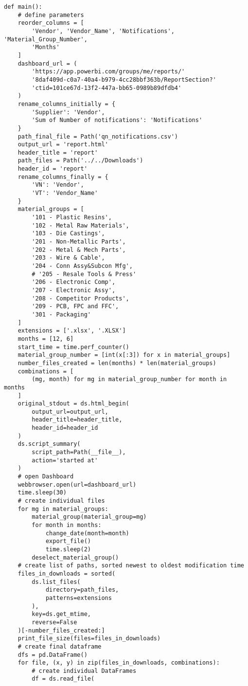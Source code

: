 \documentclass[10pt, letterpaper, twoside]{article}
\begin{document}
\begin{footnotesize}
\begin{verbatim}
def main():
    # define parameters
    reorder_columns = [
        'Vendor', 'Vendor_Name', 'Notifications', 'Material_Group_Number',
        'Months'
    ]
    dashboard_url = (
        'https://app.powerbi.com/groups/me/reports/'
        '8daf409d-c0a7-40a4-b979-4cc28bbf363b/ReportSection?'
        'ctid=101ce67d-13f2-447a-bb65-0989b89dfdb4'
    )
    rename_columns_initially = {
        'Supplier': 'Vendor',
        'Sum of Number of notifications': 'Notifications'
    }
    path_final_file = Path('qn_notifications.csv')
    output_url = 'report.html'
    header_title = 'report'
    path_files = Path('../../Downloads')
    header_id = 'report'
    rename_columns_finally = {
        'VN': 'Vendor',
        'VT': 'Vendor_Name'
    }
    material_groups = [
        '101 - Plastic Resins',
        '102 - Metal Raw Materials',
        '103 - Die Castings',
        '201 - Non-Metallic Parts',
        '202 - Metal & Mech Parts',
        '203 - Wire & Cable',
        '204 - Conn Assy&Subcon Mfg',
        # '205 - Resale Tools & Press'
        '206 - Electronic Comp',
        '207 - Electronic Assy',
        '208 - Competitor Products',
        '209 - PCB, FPC and FFC',
        '301 - Packaging'
    ]
    extensions = ['.xlsx', '.XLSX']
    months = [12, 6]
    start_time = time.perf_counter()
    material_group_number = [int(x[:3]) for x in material_groups]
    number_files_created = len(months) * len(material_groups)
    combinations = [
        (mg, month) for mg in material_group_number for month in months
    ]
    original_stdout = ds.html_begin(
        output_url=output_url,
        header_title=header_title,
        header_id=header_id
    )
    ds.script_summary(
        script_path=Path(__file__),
        action='started at'
    )
    # open Dashboard
    webbrowser.open(url=dashboard_url)
    time.sleep(30)
    # create individual files
    for mg in material_groups:
        material_group(material_group=mg)
        for month in months:
            change_date(month=month)
            export_file()
            time.sleep(2)
        deselect_material_group()
    # create list of paths, sorted newest to oldest modification time
    files_in_downloads = sorted(
        ds.list_files(
            directory=path_files,
            patterns=extensions
        ),
        key=ds.get_mtime,
        reverse=False
    )[-number_files_created:]
    print_file_size(files=files_in_downloads)
    # create final dataframe
    dfs = pd.DataFrame()
    for file, (x, y) in zip(files_in_downloads, combinations):
        # create individual DataFrames
        df = ds.read_file(

\end{verbatim}
\end{footnotesize}
\end{document}
